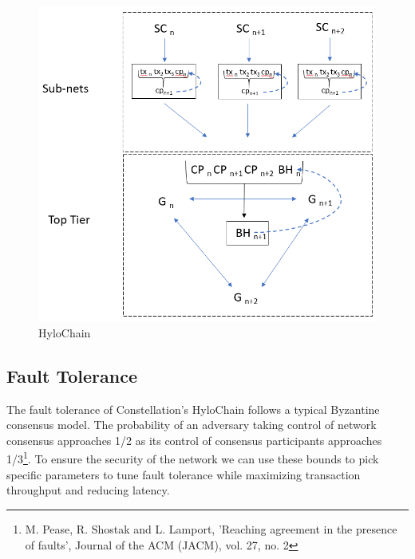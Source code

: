 \documentclass{article}
\begin{document}
\begin{figure}[H]
\centering
\includegraphics[scale=0.65]{HyloChain.png}
\caption{HyloChain}
\end{figure} 

\subsection{Fault Tolerance}
The fault tolerance of Constellation's HyloChain follows a typical Byzantine consensus model. The probability of an adversary taking control of network consensus approaches 1/2 as its control of consensus participants approaches 1/3\footnote{M. Pease, R. Shostak and L. Lamport, 'Reaching agreement in the presence of faults', Journal of the ACM (JACM), vol. 27, no. 2}. To ensure the security of the network we can use these bounds to pick specific parameters to tune fault tolerance while maximizing transaction throughput and reducing latency. 
\end{document}
